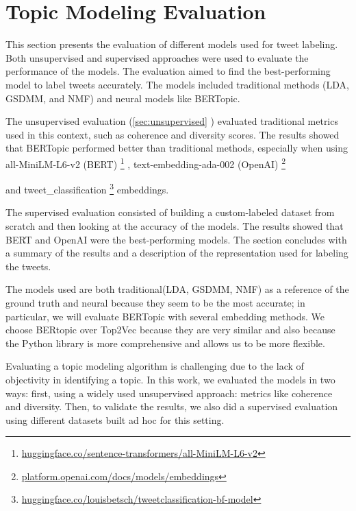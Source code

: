 \section{Topic Modeling Evaluation}

    \graphicspath{{Chapter4/Figures}{Chapter4/Figures}}

This section presents the evaluation of different models used for tweet labeling. Both unsupervised and supervised approaches were used to evaluate the performance of the models. 
The evaluation aimed to find the best-performing model to label tweets accurately. 
The models included traditional methods (LDA, GSDMM, and NMF) and neural models like  BERTopic. 

The unsupervised evaluation (\ref{sec:unsupervised} ) evaluated traditional metrics used in this context, such as coherence and diversity scores.  The  results showed that BERTopic performed better than traditional methods, especially when using all-MiniLM-L6-v2 (BERT) \footnote{\href{https://huggingface.co/sentence-transformers/all-MiniLM-L6-v2}{huggingface.co/sentence-transformers/all-MiniLM-L6-v2}}
, text-embedding-ada-002 (OpenAI) \footnote{\href{https://platform.openai.com/docs/models/embeddings}{platform.openai.com/docs/models/embeddings}}

and tweet\_classification \footnote{\href{https://huggingface.co/louisbetsch/tweetclassification-bf-model}{huggingface.co/louisbetsch/tweetclassification-bf-model}} embeddings. 


The supervised evaluation consisted of building a custom-labeled dataset from scratch and then looking at the accuracy of the models. The results showed that BERT and OpenAI were the best-performing models. The section concludes with a summary of the results and a description of the representation used for labeling the tweets.

The models used are both traditional(LDA, GSDMM, NMF) as a reference of the ground truth and neural because they seem to be the most accurate; in particular, we will evaluate BERTopic with several embedding methods. We choose BERtopic over Top2Vec because they are very similar and also because the Python library is more comprehensive and allows us to be more flexible.

Evaluating a topic modeling algorithm is challenging due to the lack of objectivity in identifying a topic. In this work, we evaluated the models in two ways: first, using a widely used unsupervised approach: metrics like coherence and diversity. 
Then, to validate the results, we also did a supervised evaluation using different datasets built ad hoc for this setting.

